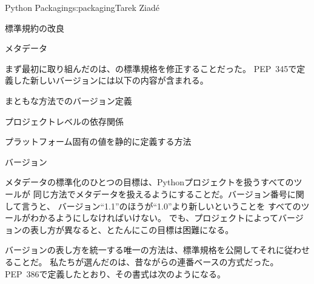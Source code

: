 \begin{aosachapter}{Python Packaging}{s:packaging}{Tarek Ziad\'{e}}
\begin{aosasect1}{標準規約の改良}
\begin{aosasect2}{メタデータ}

まず最初に取り組んだのは、の標準規格を修正することだった。
PEP~345で定義した新しいバージョンには以下の内容が含まれる。

\begin{aosaitemize}

  \item まともな方法でのバージョン定義

  \item プロジェクトレベルの依存関係

  \item プラットフォーム固有の値を静的に定義する方法

\end{aosaitemize}

\begin{aosasect3}{バージョン}

メタデータの標準化のひとつの目標は、Pythonプロジェクトを扱うすべてのツールが
同じ方法でメタデータを扱えるようにすることだ。バージョン番号に関して言うと、
バージョン``1.1''のほうが``1.0''より新しいということを
すべてのツールがわかるようにしなければいけない。
でも、プロジェクトによってバージョンの表し方が異なると、とたんにこの目標は困難になる。

バージョンの表し方を統一する唯一の方法は、標準規格を公開してそれに従わせることだ。
私たちが選んだのは、昔ながらの連番ベースの方式だった。
PEP~386で定義したとおり、その書式は次のようになる。


\end{aosasect3}
\end{aosasect2}
\end{aosasect1}
\end{aosachapter}
